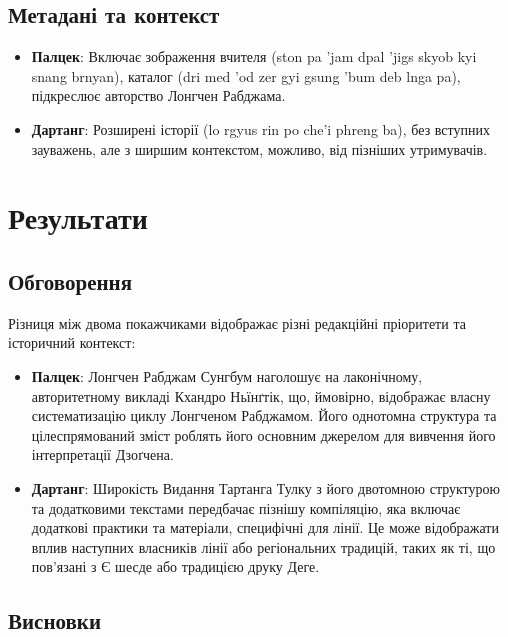 \documentclass{article}
\begin{document}
\newpage
\subsection{Метадані та контекст}


\begingroup\raggedright
\begin{itemize}
    \item \textbf{Палцек}: Включає зображення вчителя (ston pa 'jam dpal 'jigs skyob kyi snang brnyan), каталог (dri med 'od zer gyi gsung 'bum deb lnga pa), підкреслює авторство Лонгчен Рабджама.
    \item \textbf{Дартанг}: Розширені історії (lo rgyus rin po che'i phreng ba), без вступних зауважень, але з ширшим контекстом, можливо, від пізніших утримувачів.
\end{itemize}
\endgroup

\section{Результати}

\subsection{Обговорення}

Різниця між двома покажчиками відображає різні редакційні пріоритети та історичний контекст:

\begingroup\raggedright
\begin{itemize}
\item \textbf{Палцек}: Лонгчен Рабджам Сунгбум наголошує на лаконічному, авторитетному викладі Кхандро Ньїнґтік, що, ймовірно, відображає власну систематизацію циклу Лонгченом Рабджамом. Його однотомна структура та цілеспрямований зміст роблять його основним джерелом для вивчення його інтерпретації Дзоґчена.
\item \textbf{Дартанг}: Широкість Видання Тартанга Тулку з його двотомною структурою та додатковими текстами передбачає пізнішу компіляцію, яка включає додаткові практики та матеріали, специфічні для лінії. Це може відображати вплив наступних власників лінії або регіональних традицій, таких як ті, що пов'язані з Є шесде або традицією друку Деге.
\end{itemize}
\endgroup

\subsection{Висновки}
\end{document}
